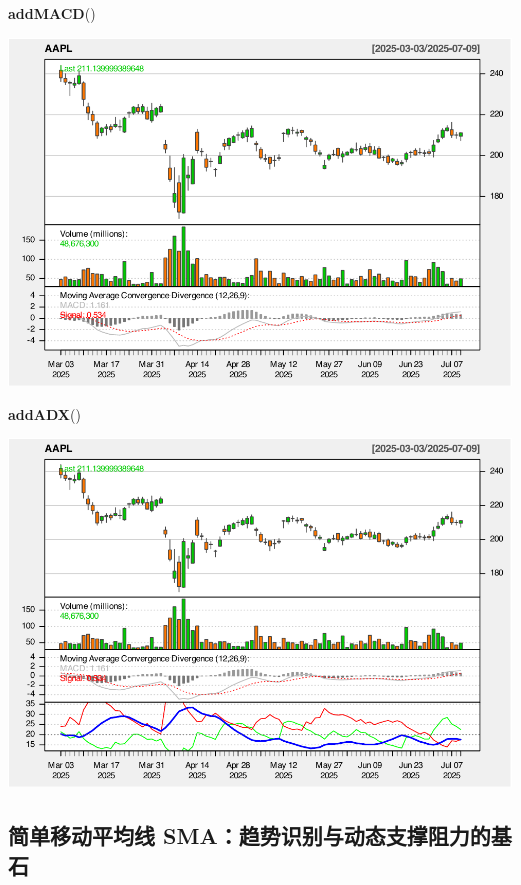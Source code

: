 \documentclass[]{ctexbook}
\newenvironment{Shaded}{\begin{snugshade}}{\end{snugshade}}
\newcommand{\FunctionTok}[1]{\textcolor[rgb]{0.13,0.29,0.53}{\textbf{#1}}}
\newcommand{\NormalTok}[1]{#1}
\begin{document}
\begin{Shaded}
\begin{Highlighting}[]
\FunctionTok{addMACD}\NormalTok{()}
\end{Highlighting}
\end{Shaded}

\includegraphics[width=0.9\linewidth]{quantmod_files/figure-latex/adx_2-2}

\begin{Shaded}
\begin{Highlighting}[]
\FunctionTok{addADX}\NormalTok{()  }
\end{Highlighting}
\end{Shaded}

\includegraphics[width=0.9\linewidth]{quantmod_files/figure-latex/adx_2-3}

\subsection{简单移动平均线 SMA：趋势识别与动态支撑阻力的基石}\label{ux7b80ux5355ux79fbux52a8ux5e73ux5747ux7ebf-smaux8d8bux52bfux8bc6ux522bux4e0eux52a8ux6001ux652fux6491ux963bux529bux7684ux57faux77f3}
\end{document}

